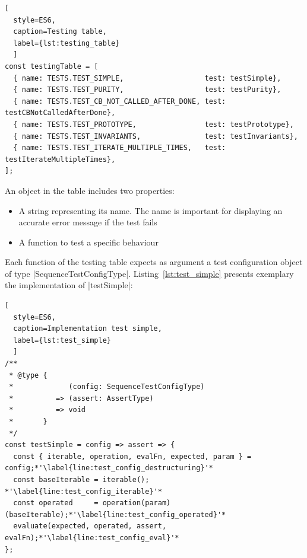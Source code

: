 \begin{lstlisting}[
  style=ES6, 
  caption=Testing table,
  label={lst:testing_table}
  ]
const testingTable = [
  { name: TESTS.TEST_SIMPLE,                   test: testSimple},
  { name: TESTS.TEST_PURITY,                   test: testPurity},
  { name: TESTS.TEST_CB_NOT_CALLED_AFTER_DONE, test: testCBNotCalledAfterDone},
  { name: TESTS.TEST_PROTOTYPE,                test: testPrototype},
  { name: TESTS.TEST_INVARIANTS,               test: testInvariants},
  { name: TESTS.TEST_ITERATE_MULTIPLE_TIMES,   test: testIterateMultipleTimes},
];
\end{lstlisting}

An object in the table includes two properties:
\begin{itemize}
\item{A string representing its name. The name is important for displaying an 
  accurate error message if the test fails}
\item{A function to test a specific behaviour}
\end{itemize}

Each function of the testing table expects as argument a test configuration
object of type |SequenceTestConfigType|. Listing~\ref{lst:test_simple} presents
exemplary the implementation of |testSimple|:

\begin{lstlisting}[
  style=ES6, 
  caption=Implementation test simple,
  label={lst:test_simple}
  ]
/**
 * @type {
 *             (config: SequenceTestConfigType)
 *          => (assert: AssertType)
 *          => void
 *       }
 */
const testSimple = config => assert => {
  const { iterable, operation, evalFn, expected, param } = config;*'\label{line:test_config_destructuring}'*
  const baseIterable = iterable(); *'\label{line:test_config_iterable}'*
  const operated     = operation(param)(baseIterable);*'\label{line:test_config_operated}'*
  evaluate(expected, operated, assert, evalFn);*'\label{line:test_config_eval}'*
};
\end{lstlisting}

